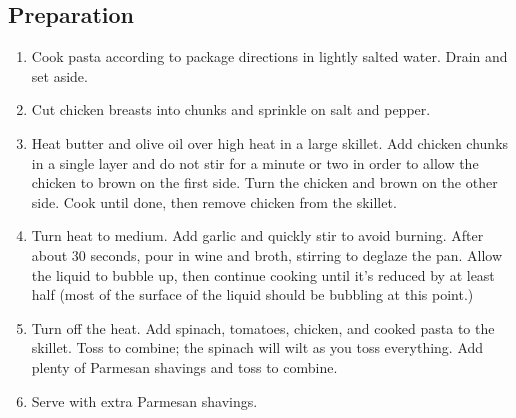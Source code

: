 \subsection{Preparation}
\begin{enumerate}
    \item Cook pasta according to package directions in lightly salted water. Drain and set aside.
    \item Cut chicken breasts into chunks and sprinkle on salt and pepper.
    \item Heat butter and olive oil over high heat in a large skillet. Add chicken chunks in a single layer and do not stir for a minute or two in order to allow the chicken to brown on the first side. Turn the chicken and brown on the other side. Cook until done, then remove chicken from the skillet.
    \item Turn heat to medium. Add garlic and quickly stir to avoid burning. After about 30 seconds, pour in wine and broth, stirring to deglaze the pan. Allow the liquid to bubble up, then continue cooking until it's reduced by at least half (most of the surface of the liquid should be bubbling at this point.)
    \item Turn off the heat. Add spinach, tomatoes, chicken, and cooked pasta to the skillet. Toss to combine; the spinach will wilt as you toss everything. Add plenty of Parmesan shavings and toss to combine.
    \item Serve with extra Parmesan shavings.

\end{enumerate}
